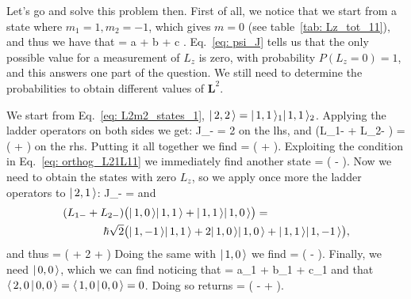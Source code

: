Let's go and solve this problem then. First of all, we notice that we start from a state where $m_1 = 1, m_2 = -1$, which gives $m=0$ (see table~\ref{tab: Lz_tot_11}), and thus we have that
\be
    \label{eq: psi_J}
    \ke{\psi} = a  + b  + c .
\ee
Eq.~\eqref{eq: psi_J} tells us that the only possible value for a measurement of $L_z$ is zero, with probability $P(L_z=0) = 1$, and this answers one part of the question. We still need to determine the probabilities to obtain different values of $\bm{L}^2$.

We start from Eq.~\eqref{eq: L2m2_states_1}, $| \, 2, 2 \, \rangle = | \, 1, 1 \, \rangle_1 | \, 1, 1 \, \rangle_2$. Applying the ladder operators on both sides we get:
\be
    J_{-}  = 2 \hbar  {}
\ee
on the lhs, and 
\be
    (L_{1-} + L_{2-} )   = \hbar {} \bigl(   +   \bigr) 
\ee
on the rhs. Putting it all together we find
\be
     =  \bigl(   +   \bigr).
\ee
Exploiting the condition in Eq.~\eqref{eq: orthog_L21L11} we immediately find another state
\be
     =  \bigl(   -   \bigr).
\ee
Now we need to obtain the states with zero $L_z$, so we apply once more the ladder operators to $| \, 2, 1 \, \rangle$:
\be
    \label{eq: J20_lhs}
    J_{-}  =  \hbar {}  
\ee
and
\begin{equation}
    \begin{split}
        \label{eq: J20_rhs}
        (L_{1-} + L_{2-} ) & \bigl( | \, 1, 0 \, \rangle | \, 1, 1 \, \rangle + | \, 1, 1 \, \rangle | \, 1, 0 \, \rangle \bigr) = \\ \hbar \sqrt{2} & \bigl( | \, 1, -1 \, \rangle | \, 1, 1 \, \rangle + 2 | \, 1, 0 \, \rangle | \, 1, 0 \, \rangle + | \, 1, 1 \, \rangle | \, 1, -1 \, \rangle \bigr), 
    \end{split}
\end{equation}
and thus 
\be
    \label{eq: J20}
     =  \bigl(   + 2   +   \bigr)
\ee
Doing the same with $| \,  1, 0  \, \rangle$ we find
\be
    \label{eq: J10}
     =  \bigl(   -   \bigr).
\ee
Finally, we need $| \, 0, 0 \, \rangle$, which we can find noticing that
\be
    \label{eq: J00_cl}
     = a_1   + b_1   + c_1  
\ee
and that $\langle \,  2, 0  \, | \,  0, 0  \, \rangle = \langle \,  1, 0  \, | \,  0, 0  \, \rangle = 0$. Doing so returns
\be
    \label{eq: J00}
     =  \bigl(   -   +   \bigl).
